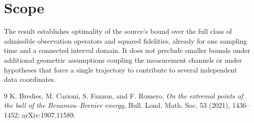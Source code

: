 \documentclass[11pt]{article}
\begin{document}
\section{Scope}

The result establishes optimality of the source's bound over the full class of
admissible observation operators and squared fidelities, already for one
sampling time and a connected interval domain.  It does not preclude smaller
bounds under additional geometric assumptions coupling the measurement
channels or under hypotheses that force a single trajectory to contribute to
several independent data coordinates.

\begin{thebibliography}{9}
K. Bredies, M. Carioni, S. Fanzon, and F. Romero,
\emph{On the extremal points of the ball of the Benamou--Brenier energy},
Bull. Lond. Math. Soc. 53 (2021), 1436--1452; arXiv:1907.11589.
\end{thebibliography}
\end{document}
